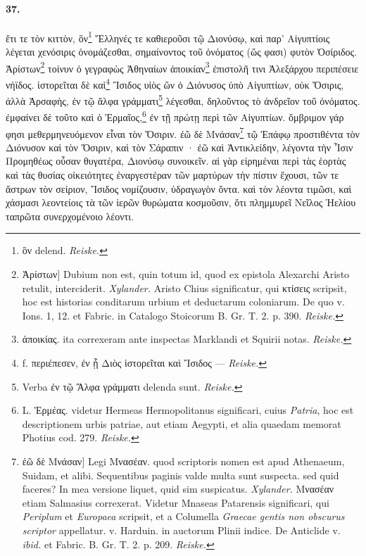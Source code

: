\documentclass[a4paper, 11pt, oneside, polutonikogreek, german]{article}
\begin{document}
\paragraph{37.}
ἔτι τε τὸν κιττὸν, ὃν\footnote{ὃν delend. \emph{Reiske.}} Ἕλληνές τε καθιεροῦσι τῷ Διονύσῳ, καὶ παρ' Αἰγυπτίοις λέγεται χενόσιρις ὀνομάζεσθαι, σημαίνοντος τοῦ ὀνόματος (ὥς φασι) φυτὸν Ὀσίριδος. Ἀρίστων\footnote{Ἀρίστων] Dubium non est, quin totum id, quod ex epistola Alexarchi Aristo retulit, interciderit. \emph{Xylander.} Aristo Chius significatur, qui κτίσεις scripsit, hoc est historias conditarum urbium et deductarum coloniarum. De quo v. Ions. 1, 12. et Fabric. in Catalogo Stoicorum B. Gr. T. 2. p. 390. \emph{Reiske.}} τοίνυν ὁ γεγραφὼς Ἀθηναίων ἀποικίαν\footnote{ἀποικίας. ita correxeram ante inspectas Marklandi et Squirii notas. \emph{Reiske.}} ἐπιστολῆ τινι Ἀλεξάρχου περιπέσειε νήϊδος. ἱστορεῖται δὲ καὶ\footnote{f. περιέπεσεν, ἐν ᾗ Διὸς ἱστορεῖται καὶ Ἴσιδος --- \emph{Reiske.}} Ἴσιδος υἱὸς ὢν ὁ Διόνυσος ὑπὸ Αἰγυπτίων, οὐκ Ὄσιρις, ἀλλὰ Ἀρσαφὴς, ἐν τῷ ἄλφα γράμματι\footnote{Verba ἐν τῷ Ἄλφα γράμματι delenda sunt. \emph{Reiske.}} λέγεσθαι, δηλοῦντος τὸ ἀνδρεῖον τοῦ ὀνόματος. ἐμφαίνει δὲ τοῦτο καὶ ὁ Ἑρμαῖος,\footnote{L. Ἑρμέας. videtur Hermeas Hermopolitanus significari, cuius \emph{Patria}, hoc est descriptionem urbis patriae, aut etiam Aegypti, et alia quaedam memorat Photius cod. 279. \emph{Reiske.}} ἐν τῇ πρώτῃ περὶ τῶν Αἰγυπτίων. ὄμβριμον γάρ φησι μεθερμηνευόμενον εἶναι τὸν Ὄσιριν. ἐῶ δὲ Μνάσαν\footnote{ἐῶ δὲ Μνάσαν] Legi Μνασέαν. quod scriptoris nomen est apud Athenaeum, Suidam, et alibi. Sequentibus paginis valde multa sunt suspecta. sed quid faceres? In mea versione liquet, quid sim suspicatus. \emph{Xylander.} Μνασέαν etiam Salmasius correxerat. Videtur Mnaseas Patarensis significari, qui \emph{Periplum} et \emph{Europaea} scripsit, et a Columella \emph{Graecae gentis non obscurus scriptor} appellatur. v. Harduin. in auctorum Plinii indice. De Anticlide v. \emph{ibid.} et Fabric. B. Gr. T. 2. p. 209. \emph{Reiske.}} τῷ Ἐπάφῳ προστιθέντα τὸν Διόνυσον καὶ τὸν Ὄσιριν, καὶ τὸν Σάραπιν · ἐῶ καὶ Ἀντικλείδην, λέγοντα τὴν Ἶσιν Προμηθέως οὖσαν θυγατέρα, Διονύσῳ συνοικεῖν. αἱ γὰρ εἰρημέναι περὶ τὰς ἑορτὰς καὶ τὰς θυσίας οἰκειότητες ἐναργεστέραν τῶν μαρτύρων τὴν πίστιν ἔχουσι, τῶν τε ἄστρων τὸν σείριον, Ἴσιδος νομίζουσιν, ὑδραγωγὸν ὄντα. καὶ τὸν λέοντα τιμῶσι, καὶ χάσμασι λεοντείοις τὰ τῶν ἱερῶν θυρώματα κοσμοῦσιν, ὅτι πλημμυρεῖ Νεῖλος Ἠελίου ταπρῶτα συνερχομένοιο λέοντι.
\end{document}
